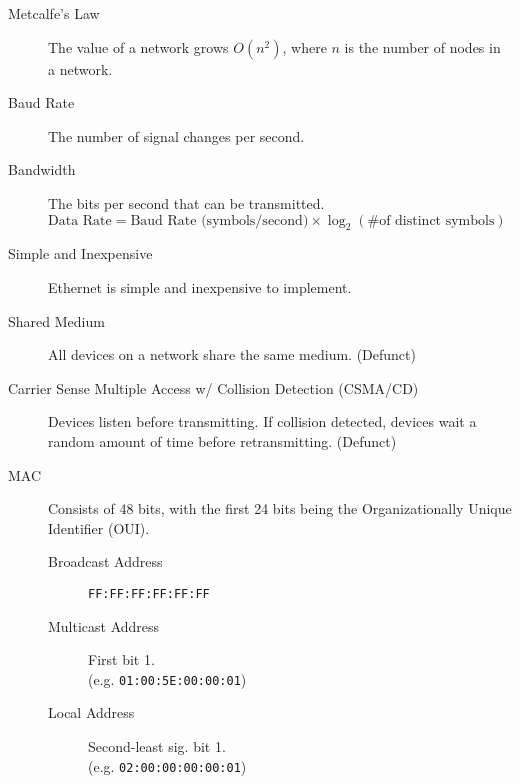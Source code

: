 \documentclass[10pt]{extarticle}
\begin{document}
\begin{multicols}{2}
  \begin{description}
    \item[Metcalfe's Law] The value of a network grows \(O(n^2)\), where \(n\) is the number of nodes in a network.
    \item[Baud Rate] The number of signal changes per second.
    \item[Bandwidth] The bits per second that can be transmitted. \\
          \hspace*{-2em}
          \(\text{Data Rate} = \text{Baud Rate (symbols/second)} \times
          \log_2 \left( \text{\# of distinct symbols} \right) \)
    \item[Simple and Inexpensive] Ethernet is simple and inexpensive to implement.
    \item[Shared Medium] All devices on a network share the same medium. (Defunct)
    \item[Carrier Sense Multiple Access w/ Collision Detection (CSMA/CD)]
          Devices listen before transmitting. If collision detected, devices
          wait a random amount of time before retransmitting. (Defunct)
    \item[MAC] Consists of 48 bits, with the first 24 bits being the Organizationally Unique
          Identifier (OUI).
          \begin{description}
            \item[Broadcast Address] \texttt{FF:FF:FF:FF:FF:FF}
            \item[Multicast Address] First bit 1. \\ (e.g. \texttt{01:00:5E:00:00:01})
            \item[Local Address] Second-least sig. bit 1. \\ (e.g. \texttt{02:00:00:00:00:01})
          \end{description}
  \end{description}


\end{multicols}
\end{document}
